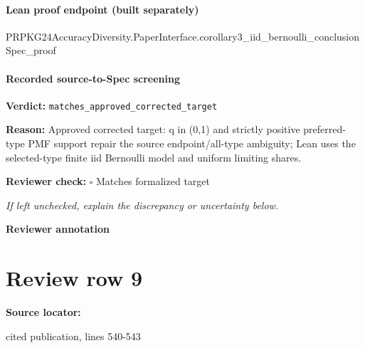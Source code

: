 \documentclass[10pt]{article}
\newcommand{\reviewerbox}{%
  \par\noindent\fbox{\parbox{0.96\linewidth}{\rule{0pt}{0.38in}}}\par
}
\newcommand{\reviewmatch}[1]{%
  \par\noindent\textbf{Reviewer check:} $\square$\; #1\par
  \noindent\emph{If left unchecked, explain the discrepancy or uncertainty below.}\par
}
\begin{document}
\paragraph{Lean proof endpoint (built separately)}\begin{ReviewVerbatim}
PRPKG24AccuracyDiversity.PaperInterface.corollary3_iid_bernoulli_conclusionSpec_proof
\end{ReviewVerbatim}

\paragraph{Recorded source-to-Spec screening}
\textbf{Verdict:} \texttt{matches\_approved\_corrected\_target}
\\
{\raggedright
\textbf{Reason:} Approved corrected target:\allowbreak{} q in (0,1) and strictly positive preferred-\allowbreak{}type PMF support repair the source endpoint/\allowbreak{}all-\allowbreak{}type ambiguity;\allowbreak{} Lean uses the selected-\allowbreak{}type finite iid Bernoulli model and uniform limiting shares.\allowbreak{}
\par}
\reviewmatch{Matches formalized target}
\noindent\textbf{Reviewer annotation}\par
\reviewerbox
\clearpage
\hypertarget{source-claim-04c6588920268e32}{}
\section*{Review row 9}
\textbf{Source locator:} {\footnotesize\raggedright cited publication, lines 540-\allowbreak{}543\par}
\end{document}
